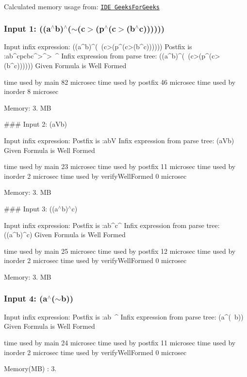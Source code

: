Calculated memory usage from\+: \href{https://ide.geeksforgeeks.org/}{\tt I\+DE Geeks\+For\+Geeks}

\subsubsection*{Input 1\+: ((a$^\wedge$b)$^\wedge$($\sim$(c$>$(p$^\wedge$(c$>$(b$^\wedge$c))))))}


\begin{DoxyCode}
Input infix expression: ((a^b)^(~(c>(p^(c>(b^c))))))
Postfix is :ab^cpcbc^>^>~^
Infix expression from parse tree: ((a^b)^(~(c>(p^(c>(b^c))))))
Given Formula is Well Formed


time used by main 82 microsec
time used by postfix 46 microsec
time used by inorder 8 microsec
\end{DoxyCode}


Memory\+: 3. MB

\#\#\# Input 2\+: (a\+Vb) 
\begin{DoxyCode}
Input infix expression: Postfix is :abV
Infix expression from parse tree: (aVb)
Given Formula is Well Formed


time used by main 23 microsec
time used by postfix 11 microsec
time used by inorder 2 microsec
time used by verifyWellFormed 0 microsec
\end{DoxyCode}


Memory\+: 3. MB

\#\#\# Input 3\+: ((a$^\wedge$b)$^\wedge$c) 
\begin{DoxyCode}
Input infix expression: Postfix is :ab^c^
Infix expression from parse tree: ((a^b)^c)
Given Formula is Well Formed


time used by main 25 microsec
time used by postfix 12 microsec
time used by inorder 2 microsec
time used by verifyWellFormed 0 microsec
\end{DoxyCode}


Memory\+: 3. MB

\subsubsection*{Input 4\+: (a$^\wedge$($\sim$b))}


\begin{DoxyCode}
Input infix expression: Postfix is :ab~^
Infix expression from parse tree: (a^(~b))
Given Formula is Well Formed


time used by main 24 microsec
time used by postfix 11 microsec
time used by inorder 2 microsec
time used by verifyWellFormed 0 microsec
\end{DoxyCode}
 Memory(\+M\+B) \+: 3.

